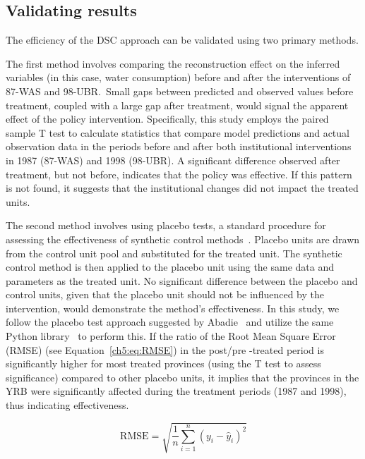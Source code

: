 \documentclass[preprint, 12pt]{elsarticle}
\begin{document}
\subsection{Validating results}\label{sec:robustness}

The efficiency of the DSC approach can be validated using two primary methods.

The first method involves comparing the reconstruction effect on the inferred variables (in this case, water consumption) before and after the interventions of 87-WAS and 98-UBR.\
Small gaps between predicted and observed values before treatment, coupled with a large gap after treatment, would signal the apparent effect of the policy intervention.
Specifically, this study employs the paired sample T test to calculate statistics that compare model predictions and actual observation data in the periods before and after both institutional interventions in 1987 (87-WAS) and 1998 (98-UBR).
A significant difference observed after treatment, but not before, indicates that the policy was effective.
If this pattern is not found, it suggests that the institutional changes did not impact the treated units.

The second method involves using placebo tests, a standard procedure for assessing the effectiveness of synthetic control methods~\cite{abadie2010}.
Placebo units are drawn from the control unit pool and substituted for the treated unit.
The synthetic control method is then applied to the placebo unit using the same data and parameters as the treated unit.
No significant difference between the placebo and control units, given that the placebo unit should not be influenced by the intervention, would demonstrate the method's effectiveness.
In this study, we follow the placebo test approach suggested by Abadie~\cite{abadie2010} and utilize the same Python library~\cite{engelbrektson2023} to perform this.
If the ratio of the Root Mean Square Error (RMSE) (see Equation~\ref{ch5:eq:RMSE}) in the post/pre -treated period is significantly higher for most treated provinces (using the T test to assess significance) compared to other placebo units, it implies that the provinces in the YRB were significantly affected during the treatment periods (1987 and 1998), thus indicating effectiveness.

\begin{equation}
    \label{ch5:eq:RMSE}
    \text{RMSE} = \sqrt{\frac{1}{n}\sum_{i=1}^{n}{(y_i-\hat{y}_i)}^2}
\end{equation}
\end{document}
